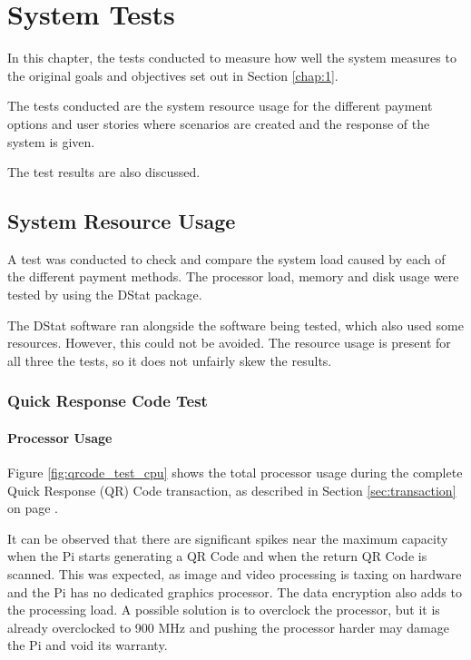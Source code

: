\chapter{System Tests}
\label{chap:6}

In this chapter, the tests  conducted to measure how well the system measures to the
original goals and objectives set out in Section \ref{chap:1}. 

The tests conducted are the system resource usage for the different payment
options and user stories where scenarios are created and the response of the
system is given.

The test results are also discussed. 

\section{System Resource Usage}

A test was conducted to check and compare the system load caused by each of the
different payment methods. The processor load, memory and disk usage were tested
by using the DStat package.

The DStat software ran alongside the software being tested, which also used some
resources. However, this could not be avoided. The resource usage is
present for all three the tests, so it does not unfairly skew the results.

\subsection{Quick Response Code Test}

\subsubsection{Processor Usage}

Figure \ref{fig:qrcode_test_cpu} shows the total processor usage during the complete
Quick Response (QR) Code transaction, as described in Section \ref{sec:transaction} on
page \pageref{sec:transaction}.

It can be observed that there are significant spikes near the maximum capacity when the Pi
starts generating a QR Code and when the return QR Code is scanned. This was expected, as
image and video processing is taxing on hardware and the Pi has no dedicated graphics
processor. The data encryption also adds to the processing load. A possible solution is to
overclock the processor, but it is already overclocked to 900 MHz and pushing the
processor harder may damage the Pi and void its warranty.

